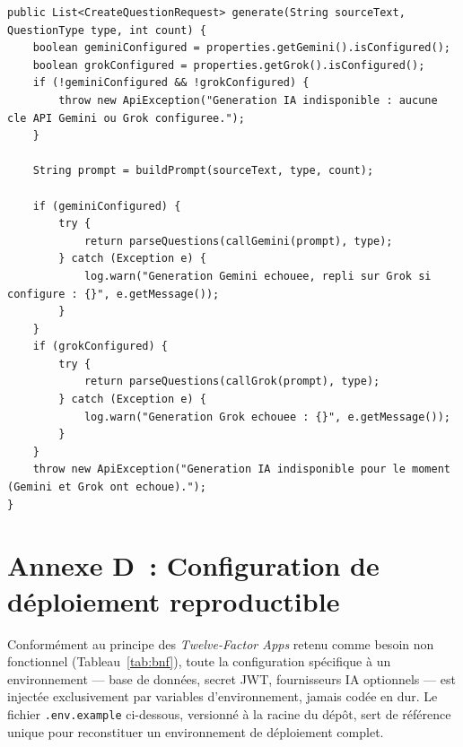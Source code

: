 \documentclass[12pt,a4paper,oneside]{report}
\begin{document}
\begin{lstlisting}[caption={Repli Gemini~$\to$~Grok dans \texttt{QuestionGenerationService}},label=lst:ai-fallback]
public List<CreateQuestionRequest> generate(String sourceText, QuestionType type, int count) {
    boolean geminiConfigured = properties.getGemini().isConfigured();
    boolean grokConfigured = properties.getGrok().isConfigured();
    if (!geminiConfigured && !grokConfigured) {
        throw new ApiException("Generation IA indisponible : aucune cle API Gemini ou Grok configuree.");
    }

    String prompt = buildPrompt(sourceText, type, count);

    if (geminiConfigured) {
        try {
            return parseQuestions(callGemini(prompt), type);
        } catch (Exception e) {
            log.warn("Generation Gemini echouee, repli sur Grok si configure : {}", e.getMessage());
        }
    }
    if (grokConfigured) {
        try {
            return parseQuestions(callGrok(prompt), type);
        } catch (Exception e) {
            log.warn("Generation Grok echouee : {}", e.getMessage());
        }
    }
    throw new ApiException("Generation IA indisponible pour le moment (Gemini et Grok ont echoue).");
}
\end{lstlisting}


\section{Annexe D~: Configuration de déploiement reproductible}

Conformément au principe des \emph{Twelve-Factor Apps} retenu comme
besoin non fonctionnel (Tableau~\ref{tab:bnf}), toute la configuration
spécifique à un environnement --- base de données, secret JWT,
fournisseurs IA optionnels --- est injectée exclusivement par variables
d'environnement, jamais codée en dur. Le fichier \texttt{.env.example}
ci-dessous, versionné à la racine du dépôt, sert de référence unique pour
reconstituer un environnement de déploiement complet.
\end{document}
